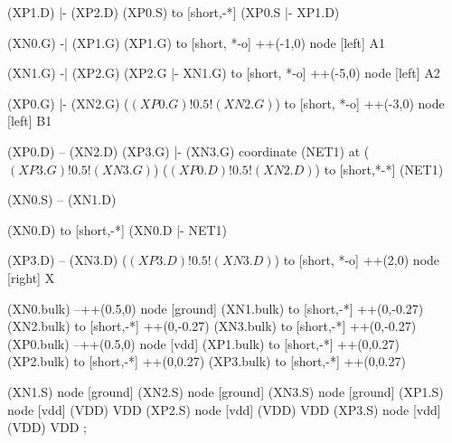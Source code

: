 \begin{circuitikz}[american]
	
	(XP1.D) |- (XP2.D)
	(XP0.S) to [short,-*] (XP0.S |- XP1.D)
	
	(XN0.G) -| (XP1.G)
	(XP1.G) to [short, *-o] ++(-1,0) node [left] {A1}
	
	(XN1.G) -| (XP2.G)
	(XP2.G |- XN1.G) to [short, *-o] ++(-5,0) node [left] {A2}
	
	(XP0.G) |- (XN2.G) 
	($(XP0.G)!0.5!(XN2.G)$) to [short, *-o] ++(-3,0) node [left] {B1}
	
	(XP0.D) -- (XN2.D)
	(XP3.G) |- (XN3.G)
	coordinate (NET1) at ($(XP3.G)!0.5!(XN3.G)$)
	($(XP0.D)!0.5!(XN2.D)$) to [short,*-*]  (NET1)
	
	(XN0.S) -- (XN1.D)
	
	(XN0.D) to [short,-*] (XN0.D |- NET1)
	
	(XP3.D) -- (XN3.D)
	($(XP3.D)!0.5!(XN3.D)$) to [short, *-o] ++(2,0) node [right] {X}
	
	(XN0.bulk) --++(0.5,0) node [ground]{}
	(XN1.bulk) to [short,-*] ++(0,-0.27)
	(XN2.bulk) to [short,-*] ++(0,-0.27)
	(XN3.bulk) to [short,-*] ++(0,-0.27)
	(XP0.bulk) --++(0.5,0) node [vdd]{}
	(XP1.bulk) to [short,-*] ++(0,0.27)
	(XP2.bulk) to [short,-*] ++(0,0.27)
	(XP3.bulk) to [short,-*] ++(0,0.27)


	(XN1.S) node [ground] {}
	(XN2.S) node [ground] {}
	(XN3.S) node [ground] {}
	(XP1.S) node [vdd] (VDD) {VDD}
	(XP2.S) node [vdd] (VDD) {VDD}
	(XP3.S) node [vdd] (VDD) {VDD}
;

\end{circuitikz}
